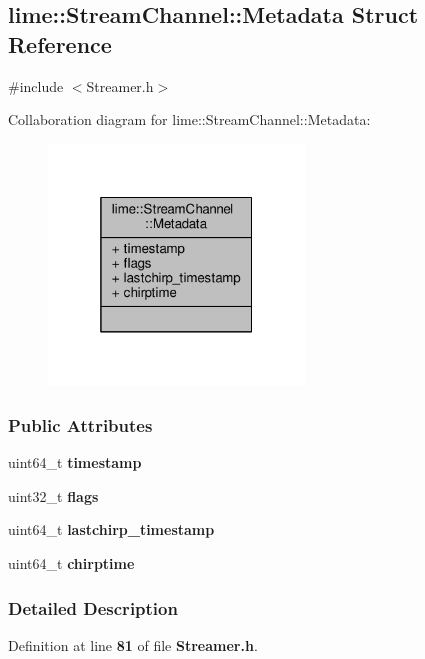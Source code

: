 \subsection{lime\+:\+:Stream\+Channel\+:\+:Metadata Struct Reference}
\label{structlime_1_1StreamChannel_1_1Metadata}


{\ttfamily \#include $<$Streamer.\+h$>$}



Collaboration diagram for lime\+:\+:Stream\+Channel\+:\+:Metadata\+:
\nopagebreak
\begin{figure}[H]
\begin{center}
\leavevmode
\includegraphics[width=193pt]{dd/d58/structlime_1_1StreamChannel_1_1Metadata__coll__graph}
\end{center}
\end{figure}
\subsubsection*{Public Attributes}
\begin{DoxyCompactItemize}
\item 
uint64\+\_\+t {\bf timestamp}
\item 
uint32\+\_\+t {\bf flags}
\item 
uint64\+\_\+t {\bf lastchirp\+\_\+timestamp}
\item 
uint64\+\_\+t {\bf chirptime}
\end{DoxyCompactItemize}


\subsubsection{Detailed Description}


Definition at line {\bf 81} of file {\bf Streamer.\+h}.



